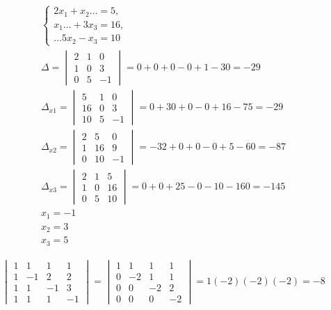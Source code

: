 \documentclass[a4paper, 11pt, oneside]{article}
\begin{document}
\begin{gather*}
	\begin{cases}
		2x_1+x_2 \dots  =5,\\
		x_1 \dots +3x_3=16,\\
		\dots 5x_2-x_3=10
	\end{cases}\\
	\varDelta =
	\begin{vmatrix}
		2& 1& 0\\
		1& 0& 3\\
		0& 5& -1
	\end{vmatrix}=0+0+0-0+1-30=-29\\
	\varDelta_{x1} =
	\begin{vmatrix}
		5& 1& 0\\
		16& 0& 3\\
		10& 5& -1
	\end{vmatrix}=0+30+0-0+16-75=-29\\
	\varDelta_{x2} =
	\begin{vmatrix}
		2& 5& 0\\
		1& 16& 9\\
		0& 10& -1
	\end{vmatrix}=-32+0+0-0+5-60=-87\\
	\varDelta_{x3} =
	\begin{vmatrix}
		2& 1& 5\\
		1& 0& 16\\
		0& 5& 10
	\end{vmatrix}=0+0+25-0-10-160=-145\\
	x_1=-1\\
	x_2=3\\
	x_3=5
\end{gather*}

\begin{gather*}
	\begin{vmatrix}
		1& 1& 1& 1\\
		1& -1& 2& 2\\
		1& 1& -1& 3\\
		1& 1& 1& -1
	\end{vmatrix}
	=
	\begin{vmatrix}
		1& 1& 1& 1\\
		0& -2& 1& 1\\
		0& 0& -2& 2\\
		0& 0& 0& -2
	\end{vmatrix}=1(-2)(-2)(-2)=-8
\end{gather*}
\end{document}

